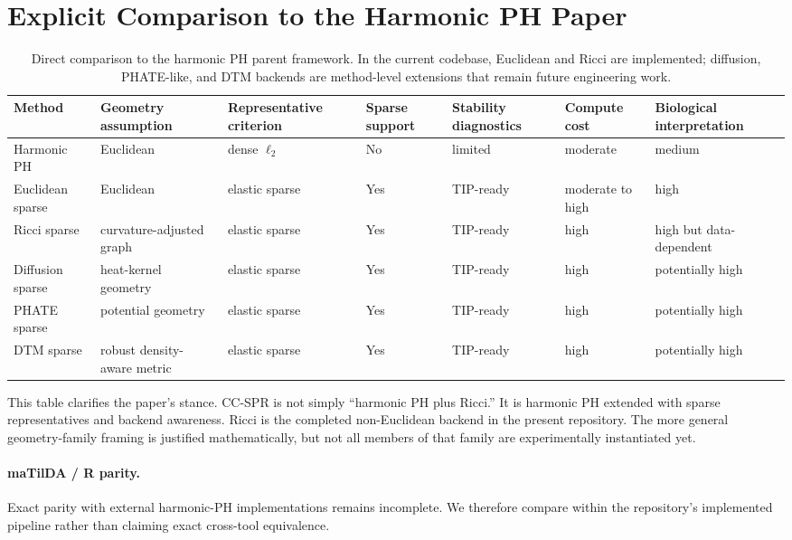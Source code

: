 \documentclass[11pt]{article}
\begin{document}
\section{Explicit Comparison to the Harmonic PH Paper}
\begin{table}[h]
\centering
\small
\begin{tabular}{p{2.0cm}p{1.7cm}p{1.7cm}p{1.3cm}p{1.5cm}p{1.5cm}p{1.9cm}}
\toprule
Method & Geometry assumption & Representative criterion & Sparse support & Stability diagnostics & Compute cost & Biological interpretation \\
\midrule
Harmonic PH & Euclidean & dense $\ell_2$ & No & limited & moderate & medium \\
Euclidean sparse & Euclidean & elastic sparse & Yes & TIP-ready & moderate to high & high \\
Ricci sparse & curvature-adjusted graph & elastic sparse & Yes & TIP-ready & high & high but data-dependent \\
Diffusion sparse & heat-kernel geometry & elastic sparse & Yes & TIP-ready & high & potentially high \\
PHATE sparse & potential geometry & elastic sparse & Yes & TIP-ready & high & potentially high \\
DTM sparse & robust density-aware metric & elastic sparse & Yes & TIP-ready & high & potentially high \\
\bottomrule
\end{tabular}
\caption{Direct comparison to the harmonic PH parent framework. In the current codebase, Euclidean and Ricci are implemented; diffusion, PHATE-like, and DTM backends are method-level extensions that remain future engineering work.}
\label{tab:hphcompare}
\end{table}

This table clarifies the paper's stance. CC-SPR is not simply ``harmonic PH plus Ricci.'' It is harmonic PH extended with sparse representatives and backend awareness. Ricci is the completed non-Euclidean backend in the present repository. The more general geometry-family framing is justified mathematically, but not all members of that family are experimentally instantiated yet.

\paragraph{maTilDA / R parity.}
Exact parity with external harmonic-PH implementations remains incomplete. We therefore compare within the repository's implemented pipeline rather than claiming exact cross-tool equivalence.
\end{document}
